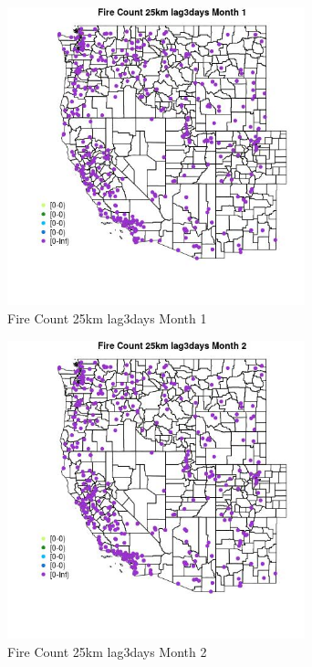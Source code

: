 \begin{figure} 
\centering  
\includegraphics[width=0.77\textwidth]{Code_Outputs/Report_ML_input_PM25_Step4_part_e_de_duplicated_aves_compiled_2019-05-18wNAs_MapObsMo1Fire_Count_25km_lag3days.jpg} 
\caption{\label{fig:Report_ML_input_PM25_Step4_part_e_de_duplicated_aves_compiled_2019-05-18wNAsMapObsMo1Fire_Count_25km_lag3days}Fire Count 25km lag3days Month 1} 
\end{figure} 
 

\begin{figure} 
\centering  
\includegraphics[width=0.77\textwidth]{Code_Outputs/Report_ML_input_PM25_Step4_part_e_de_duplicated_aves_compiled_2019-05-18wNAs_MapObsMo2Fire_Count_25km_lag3days.jpg} 
\caption{\label{fig:Report_ML_input_PM25_Step4_part_e_de_duplicated_aves_compiled_2019-05-18wNAsMapObsMo2Fire_Count_25km_lag3days}Fire Count 25km lag3days Month 2} 
\end{figure} 
 

